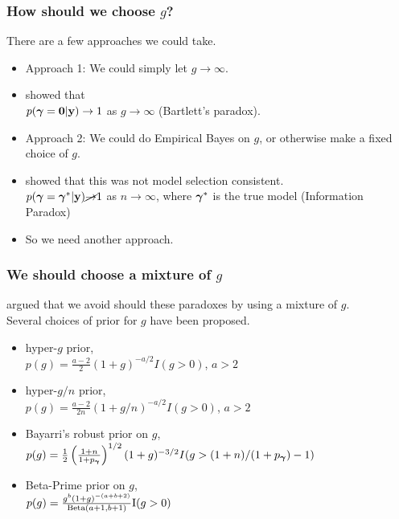 \documentclass[notes=only]{beamer}
\begin{document}
\begin{frame}
	\frametitle{How should we choose $g$?}
	There are a few approaches we could take.
	\begin{itemize}
		\item Approach 1: We could simply let $g \to \infty$.
		\item \cite{Liang2008} showed that\\
		$p({\boldsymbol \gamma} = {\bf 0} | {\bf y}) \to 1$ as $g \to \infty$ (Bartlett's paradox).
		\item Approach 2: We could do Empirical Bayes on $g$, or otherwise make a fixed choice of $g$.
		\item \cite{Liang2008} showed that this was not model selection consistent. \\
					$p({\boldsymbol \gamma} = {\boldsymbol \gamma}^* | {\bf y}) \cancel{\to} 1$ as $n \to \infty$,
					where ${\boldsymbol \gamma}^*$ is the true model (Information Paradox)
		\item So we need another approach.
	\end{itemize}
\end{frame}


\begin{frame}
	\frametitle{We should choose a mixture of $g$}
	\cite{Liang2008} argued that we avoid should these paradoxes by using a mixture of $g$. \\
	Several choices of prior for $g$	have been proposed.
	\small
	\begin{itemize}
		\item hyper-$g$ prior, \cite{Liang2008}\\
		$p(g) = \frac{a-2}{2} (1 + g)^{-a/2} I(g > 0)$, $a > 2$
		\item hyper-$g/n$ prior, \cite{Liang2008}\\
		$p(g) = \frac{a-2}{2n} (1 + g/n)^{-a/2} I(g > 0)$, $a > 2$ 
		\item Bayarri's robust prior on $g$, \cite{Bayarri2012} \\
		$p(g) = \frac{1}{2} \left(  \frac{1 + n}{1 + p_{\boldsymbol \gamma}} \right)^{1/2} (1 + g)^{-3/2} I(g > (1 + n)/(1 + p_{\boldsymbol \gamma}) - 1)$
		\item Beta-Prime prior on $g$, \cite{Maruyama2011} \\
		$p(g) = \frac{g^b (1 + g)^{-(a + b + 2)}}{\text{Beta}(a + 1, b + 1)} \text{I}(g > 0)$
	\end{itemize}
\end{frame}
\end{document}
